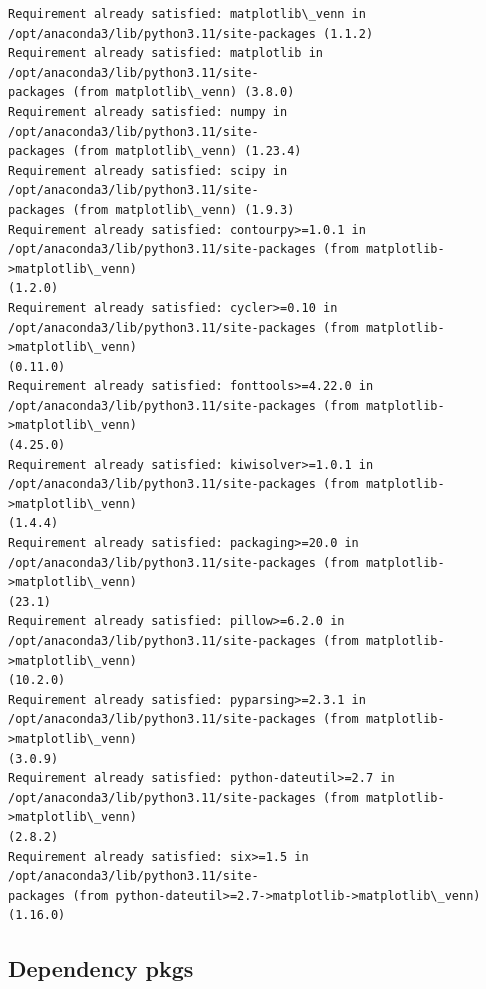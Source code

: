 \documentclass[11pt]{article}
\begin{document}
    \begin{Verbatim}[commandchars=\\\{\}]
Requirement already satisfied: matplotlib\_venn in
/opt/anaconda3/lib/python3.11/site-packages (1.1.2)
Requirement already satisfied: matplotlib in /opt/anaconda3/lib/python3.11/site-
packages (from matplotlib\_venn) (3.8.0)
Requirement already satisfied: numpy in /opt/anaconda3/lib/python3.11/site-
packages (from matplotlib\_venn) (1.23.4)
Requirement already satisfied: scipy in /opt/anaconda3/lib/python3.11/site-
packages (from matplotlib\_venn) (1.9.3)
Requirement already satisfied: contourpy>=1.0.1 in
/opt/anaconda3/lib/python3.11/site-packages (from matplotlib->matplotlib\_venn)
(1.2.0)
Requirement already satisfied: cycler>=0.10 in
/opt/anaconda3/lib/python3.11/site-packages (from matplotlib->matplotlib\_venn)
(0.11.0)
Requirement already satisfied: fonttools>=4.22.0 in
/opt/anaconda3/lib/python3.11/site-packages (from matplotlib->matplotlib\_venn)
(4.25.0)
Requirement already satisfied: kiwisolver>=1.0.1 in
/opt/anaconda3/lib/python3.11/site-packages (from matplotlib->matplotlib\_venn)
(1.4.4)
Requirement already satisfied: packaging>=20.0 in
/opt/anaconda3/lib/python3.11/site-packages (from matplotlib->matplotlib\_venn)
(23.1)
Requirement already satisfied: pillow>=6.2.0 in
/opt/anaconda3/lib/python3.11/site-packages (from matplotlib->matplotlib\_venn)
(10.2.0)
Requirement already satisfied: pyparsing>=2.3.1 in
/opt/anaconda3/lib/python3.11/site-packages (from matplotlib->matplotlib\_venn)
(3.0.9)
Requirement already satisfied: python-dateutil>=2.7 in
/opt/anaconda3/lib/python3.11/site-packages (from matplotlib->matplotlib\_venn)
(2.8.2)
Requirement already satisfied: six>=1.5 in /opt/anaconda3/lib/python3.11/site-
packages (from python-dateutil>=2.7->matplotlib->matplotlib\_venn) (1.16.0)
    \end{Verbatim}

    \subsection{Dependency pkgs}\label{dependency-pkgs}
\end{document}
